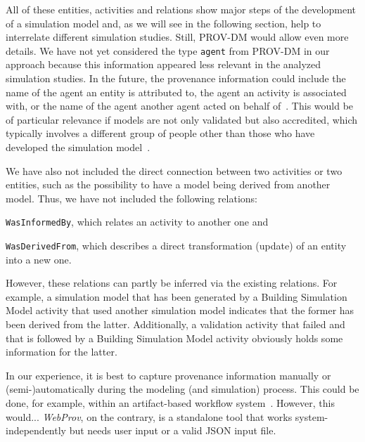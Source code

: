 \documentclass[10pt,letterpaper]{article}
\newcommand{\webprov}{\textit{WebProv}}
\newcommand{\BSM}{Building Simulation Model}
\begin{document}
All of these entities, activities and relations show major steps of the development of a simulation model and, as we will see in the following section, help to interrelate different simulation studies.
Still, PROV-DM would allow even more details.
We have not yet considered the type \texttt{agent} from PROV-DM in our approach because this information appeared less relevant in the analyzed simulation studies.
In the future, the provenance information could include the name of the agent an entity is attributed to, the agent an activity is associated with, or the name of the agent another agent acted on behalf of~\cite{Belhajjame2013}.
This would be of particular relevance if models are not only validated but also accredited, which typically involves a different group of people other than those who have developed the simulation model~\cite{Balci1997}.

We have also not included the direct connection between two activities or two entities, such as the possibility to have a model being derived from another model.
Thus, we have not included the following relations: \begin{inparaenum}[a)]
\item \texttt{WasInformedBy}, which relates an activity to another one and
\item \texttt{WasDerivedFrom}, which describes a direct transformation (update) of an entity into a new one.
\end{inparaenum}
However, these relations can partly be inferred via the existing relations.
For example, a simulation model that has been generated by a \BSM{} activity that used another simulation model indicates that the former has been derived from the latter.
Additionally, a validation activity that failed and that is followed by a \BSM{} activity obviously holds some information for the latter.

In our experience, it is best to capture provenance information manually or (semi-)automatically during the modeling (and simulation) process.
This could be done, for example, within an artifact-based workflow system~\cite{Ruscheinski2019}.
However, this would...
\webprov{}, on the contrary, is a standalone tool that works system-independently but needs user input or a valid JSON input file.


\end{document}
